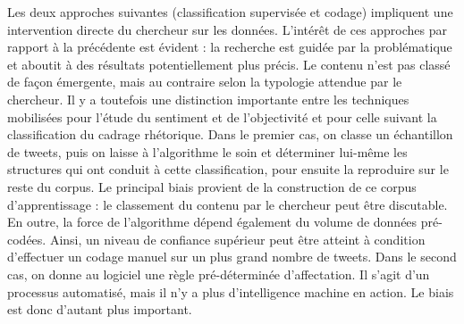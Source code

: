         Les deux approches suivantes (classification supervisée et codage) impliquent une intervention directe du chercheur sur les données. L'intérêt de ces approches par rapport à la précédente est évident : la recherche est guidée par la problématique et aboutit à des résultats potentiellement plus précis. Le contenu n'est pas classé de façon émergente, mais au contraire selon la typologie attendue par le chercheur. Il y a toutefois une distinction importante entre les techniques mobilisées pour l'étude du sentiment et de l'objectivité et pour celle suivant la classification du cadrage rhétorique. Dans le premier cas, on classe un échantillon de tweets, puis on laisse à l'algorithme le soin  et déterminer lui-même les structures qui ont conduit à cette classification, pour ensuite la reproduire sur le reste du corpus. Le principal biais provient de la construction de ce corpus d'apprentissage : le classement du contenu par le chercheur peut être discutable. En outre, la force de l'algorithme dépend également du volume de données pré-codées. Ainsi, un niveau de confiance supérieur peut être atteint à condition d'effectuer un codage manuel sur un plus grand nombre de tweets. Dans le second cas, on donne au logiciel une règle pré-déterminée d'affectation. Il s'agit d'un processus automatisé, mais il n'y a plus d'intelligence machine en action. Le biais est donc d'autant plus important. \\
